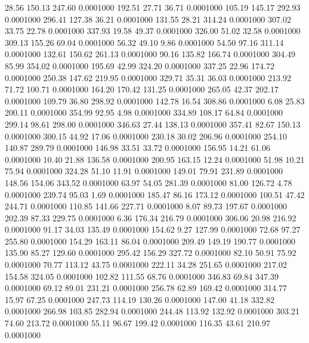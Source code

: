   28.56  150.13  247.60   0.0001000
 192.51   27.71   36.71   0.0001000
 105.19  145.17  292.93   0.0001000
 296.41  127.38   36.21   0.0001000
 131.55   28.21  314.24   0.0001000
 307.02   33.75   22.78   0.0001000
 337.93   19.58   49.37   0.0001000
 326.00   51.02   32.58   0.0001000
 309.13  155.26   69.04   0.0001000
  56.32   49.10    9.86   0.0001000
  54.50   97.16  311.14   0.0001000
 132.61  150.62  261.13   0.0001000
  90.16  135.82  166.74   0.0001000
 304.49   85.99  354.02   0.0001000
 195.69   42.99  324.20   0.0001000
 337.25   22.96  174.72   0.0001000
 250.38  147.62  219.95   0.0001000
 329.71   35.31   36.03   0.0001000
 213.92   71.72  100.71   0.0001000
 164.20  170.42  131.25   0.0001000
 265.05   42.37  202.17   0.0001000
 109.79   36.80  298.92   0.0001000
 142.78   16.54  308.86   0.0001000
   6.08   25.83  200.11   0.0001000
 354.99   92.95    4.98   0.0001000
 334.89  108.17   64.84   0.0001000
 299.14   98.61  298.00   0.0001000
 346.63   27.44  138.13   0.0001000
 357.41   82.67  150.13   0.0001000
 300.15   44.92   17.06   0.0001000
 230.18   30.02  206.96   0.0001000
 254.10  140.87  289.79   0.0001000
 146.98   33.51   33.72   0.0001000
 156.95   14.21   61.06   0.0001000
  10.40   21.88  136.58   0.0001000
 200.95  163.15   12.24   0.0001000
  51.98   10.21   75.94   0.0001000
 324.28   51.10   11.91   0.0001000
 149.01   79.91  231.89   0.0001000
 148.56  154.06  343.52   0.0001000
  63.97   54.05  281.39   0.0001000
  81.00  126.72    4.78   0.0001000
 239.74   95.03    1.69   0.0001000
 185.47   86.16  173.12   0.0001000
 100.51   47.42  244.71   0.0001000
 110.85  141.66  227.71   0.0001000
   8.07   89.73  197.67   0.0001000
 202.39   87.33  229.75   0.0001000
   6.36  176.34  216.79   0.0001000
 306.06   20.98  216.92   0.0001000
  91.17   34.03  135.49   0.0001000
 154.62    9.27  127.99   0.0001000
  72.68   97.27  255.80   0.0001000
 154.29  163.11   86.04   0.0001000
 209.49  149.19  190.77   0.0001000
 135.90   85.27  129.60   0.0001000
 295.42  156.29  327.72   0.0001000
  82.10   50.91   75.92   0.0001000
  70.77  113.12   43.75   0.0001000
 222.11   34.28  251.65   0.0001000
 217.02  154.58  324.05   0.0001000
 102.82  111.55   68.76   0.0001000
 346.83   69.84  347.39   0.0001000
  69.12   89.01  231.21   0.0001000
 256.78   62.89  169.42   0.0001000
 314.77   15.97   67.25   0.0001000
 247.73  114.19  130.26   0.0001000
 147.00   41.18  332.82   0.0001000
 266.98  103.85  282.94   0.0001000
 244.48  113.92  132.92   0.0001000
 303.21   74.60  213.72   0.0001000
  55.11   96.67  199.42   0.0001000
 116.35   43.61  210.97   0.0001000
